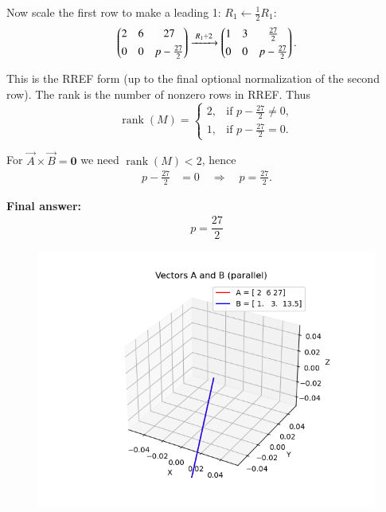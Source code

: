 \documentclass[journal]{IEEEtran}
\begin{document}
Now scale the first row to make a leading 1: \(R_1 \leftarrow \tfrac{1}{2}R_1\):
\begin{align}
\begin{pmatrix}2 & 6 & 27 \\[4pt] 0 & 0 & p - \tfrac{27}{2} \end{pmatrix}
\xrightarrow{\;R_1 \div 2\;}
\begin{pmatrix}1 & 3 & \tfrac{27}{2} \\[4pt] 0 & 0 & p - \tfrac{27}{2} \end{pmatrix}.
\end{align}

This is the RREF form (up to the final optional normalization of the second row). The rank is the number of nonzero rows in RREF. Thus
\[
\operatorname{rank}(M)=
\begin{cases}
2, & \text{if } p - \tfrac{27}{2} \neq 0,\\[4pt]
1, & \text{if } p - \tfrac{27}{2} = 0.
\end{cases}
\]

For \(\vec{A}\times\vec{B}=\mathbf0\) we need \(\operatorname{rank}(M)<2\), hence
\begin{align}
p - \tfrac{27}{2} &= 0 \quad\Rightarrow\quad p = \tfrac{27}{2}.
\end{align}

\textbf{Final answer:}
\begin{align}
\boxed{\,p = \dfrac{27}{2}\,}
\end{align}



\begin{figure}[H]
    \centering
    \includegraphics[width=0.5\columnwidth]{figs/fig1.png}
    \caption{}
    \label{fig:fig1}
\end{figure}
\end{document}
